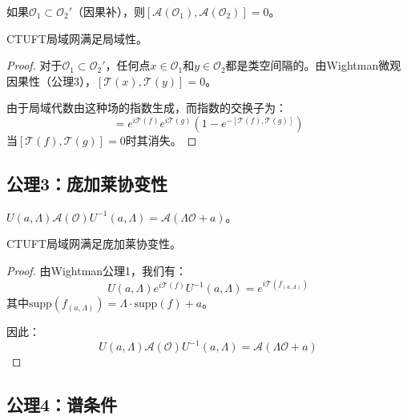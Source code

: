 \begin{axiom}[局域性]
如果$\mathcal{O}_1 \subset \mathcal{O}_2'$（因果补），则$[\mathcal{A}(\mathcal{O}_1), \mathcal{A}(\mathcal{O}_2)] = 0$。
\end{axiom}

\begin{theorem}[局域性验证]
CTUFT局域网满足局域性。
\end{theorem}

\begin{proof}
对于$\mathcal{O}_1 \subset \mathcal{O}_2'$，任何点$x \in \mathcal{O}_1$和$y \in \mathcal{O}_2$都是类空间隔的。由Wightman微观因果性（公理3），$[\mathcal{T}(x), \mathcal{T}(y)] = 0$。

由于局域代数由这种场的指数生成，而指数的交换子为：
\begin{equation}
    [e^{i\mathcal{T}(f)}, e^{i\mathcal{T}(g)}] = e^{i\mathcal{T}(f)} e^{i\mathcal{T}(g)} (1 - e^{-[\mathcal{T}(f), \mathcal{T}(g)]})
\end{equation}
当$[\mathcal{T}(f), \mathcal{T}(g)] = 0$时其消失。
\end{proof}

\subsection{公理3：庞加莱协变性}

\begin{axiom}[庞加莱协变性]
$U(a, \Lambda) \mathcal{A}(\mathcal{O}) U^{-1}(a, \Lambda) = \mathcal{A}(\Lambda \mathcal{O} + a)$。
\end{axiom}

\begin{theorem}[协变性验证]
CTUFT局域网满足庞加莱协变性。
\end{theorem}

\begin{proof}
由Wightman公理1，我们有：
\begin{equation}
    U(a, \Lambda) e^{i\mathcal{T}(f)} U^{-1}(a, \Lambda) = e^{i\mathcal{T}(f_{(a,\Lambda)})}
\end{equation}
其中$\text{supp}(f_{(a,\Lambda)}) = \Lambda \cdot \text{supp}(f) + a$。

因此：
\begin{equation}
    U(a, \Lambda) \mathcal{A}(\mathcal{O}) U^{-1}(a, \Lambda) = \mathcal{A}(\Lambda \mathcal{O} + a)
\end{equation}
\end{proof}

\subsection{公理4：谱条件}

